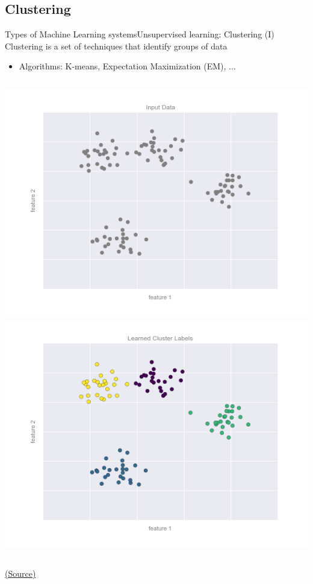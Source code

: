 \documentclass[10pt,compress]{beamer} %
\begin{document}
\subsection{Clustering}
\begin{frame}{Types of Machine Learning systems}{Unsupervised learning: Clustering (I)}
	Clustering is a set of techniques that identify groups of data
		\begin{itemize}
			\item Algorithms: K-means, Expectation Maximization (EM), ...
		\end{itemize}

    \begin{columns}
			\includegraphics[width=\linewidth]{figs/05.01-clustering-1.png}
			\includegraphics[width=\linewidth]{figs/05.01-clustering-2.png}
    \end{columns}

    \centering \tiny{\href{https://jakevdp.github.io/PythonDataScienceHandbook/05.01-what-is-machine-learning.html}{(Source)}}
\end{frame}
\end{document}
